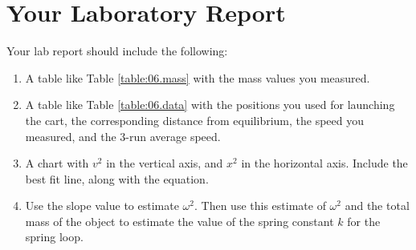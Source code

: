 \section{Your Laboratory Report}
Your lab report should include the following:
\begin{enumerate}
    \item A table like Table \ref{table:06.mass} with the mass values you measured.
    \item A table like Table \ref{table:06.data} with the positions you used for launching the cart, the corresponding distance from equilibrium, the speed you measured, and the 3-run average speed.
    \item A chart with $v^{2}$ in the vertical axis, and $x^{2}$ in the horizontal axis. Include the best fit line, along with the equation.
    \item Use the slope value to estimate $\omega^{2}$. Then use this estimate of $\omega^{2}$ and the total mass of the object to estimate the value of the spring constant $k$ for the spring loop.
\end{enumerate}
\newpage
